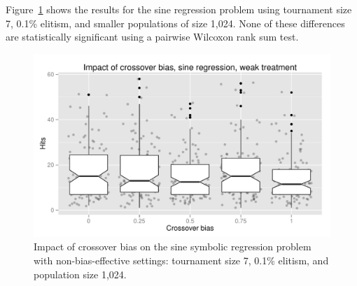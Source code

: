 \documentclass{sig-alternate}
\begin{document}
%
%
%
%

%
%
%
%

Figure~\ref{fig:sineBiasResultsWeak} shows the results for the sine regression problem using tournament size 7, 0.1\%
elitism, and smaller populations  of size 1,024. None of these differences are statistically significant using a
pairwise Wilcoxon rank sum test.

\begin{figure}
\centering
\includegraphics[width=0.45 \textwidth]{Plots/Sine_XO_impact_weak_boxplot.pdf}
\caption{Impact of crossover bias on the sine symbolic regression problem with non-bias-effective settings: tournament
size 7, 0.1\% elitism, and population size 1,024.}
\label{fig:sineBiasResultsWeak}
\end{figure}
\end{document}
